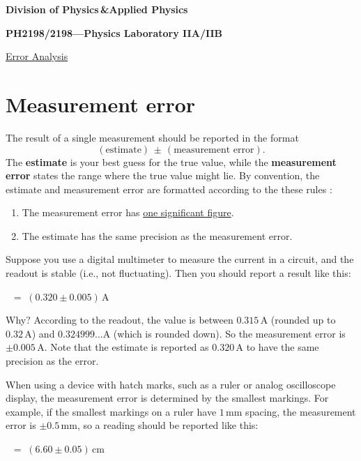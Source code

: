 \documentclass[11pt,a4paper]{article}
\begin{document}
\begin{center}
\textbf{Division of Physics\;\,\&\;Applied Physics}

\textbf{PH2198/2198---Physics Laboratory IIA/IIB}

\vskip 0.05in

\underline{\LARGE Error Analysis}
\end{center}

\section{Measurement error}

The result of a single measurement should be reported in the format
\begin{equation*}
  (\textrm{estimate})\, \pm\, (\textrm{measurement error}).
\end{equation*}
The \textbf{estimate} is your best guess for the true value, while the
\textbf{measurement error} states the range where the true value might
lie.  By convention, the estimate and measurement error are formatted
according to the these rules \cite{Hughes}:
\begin{enumerate}
\item 
  The measurement error has \underline{one significant figure}.

\item
  The estimate has the same precision as the measurement error.
\end{enumerate}

\noindent
Suppose you use a digital multimeter to measure the current in a
circuit, and the readout is stable (i.e., not fluctuating).  Then you
should report a result like this:
\begin{center}
$\;\;=\; \left(0.320 \pm 0.005\right) \, \mathrm{A}$
\end{center}
Why?  According to the readout, the value is between
$0.315\,\mathrm{A}$ (rounded up to $0.32\,\mathrm{A}$) and
$0.324999\dots\mathrm{A}$ (which is rounded down).  So the measurement
error is $\pm 0.005 \, \mathrm{A}$.  Note that the estimate is
reported as $0.320 \,\mathrm{A}$ to have the same precision as the
error.

When using a device with hatch marks, such as a ruler or analog
oscilloscope display, the measurement error is determined by the
smallest markings.  For example, if the smallest markings on a ruler
have $1\,\mathrm{mm}$ spacing, the measurement error is $\pm 0.5
\,\textrm{mm}$, so a reading should be reported like this:
\begin{center}
$\;\;=\; \left(6.60 \pm 0.05\right) \, \mathrm{cm}$
\end{center}
\end{document}
